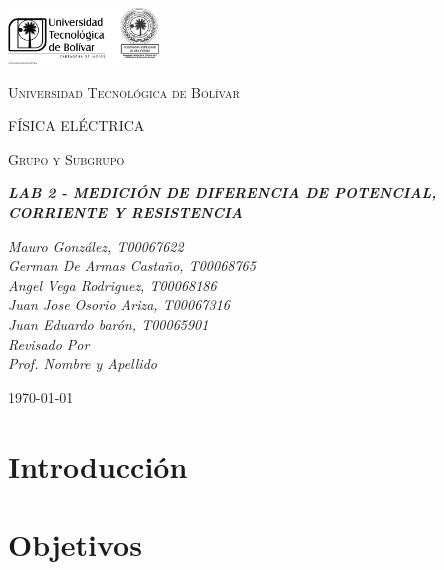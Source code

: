 \documentclass[letterpaper, 12pt]{report}
\begin{document}
\begin{titlepage}
	\centering
	\includegraphics[width=0.3\textwidth]{Images/logo_utb.png}\par\vspace{1cm}
	{\scshape\LARGE Universidad Tecnológica de Bolívar \par}
	\vspace{1cm}

	{\scshape\Large FÍSICA ELÉCTRICA \par}
	\vspace{.2cm}

	{\scshape\Large Grupo y Subgrupo \par}
	\vspace{1cm}

	\slshape {\Large \bfseries{} LAB 2 - MEDICIÓN DE DIFERENCIA DE POTENCIAL, CORRIENTE Y RESISTENCIA \\}
	\vspace{1cm}

	\slshape {\itshape{} Mauro González, T00067622 \\}
	\slshape {\itshape{} German De Armas Castaño, T00068765 \\}
	\slshape {\itshape{} Angel Vega Rodriguez, T00068186 \\}
	\slshape {\itshape{} Juan Jose Osorio Ariza, T00067316 \\}
	\slshape {\itshape{} Juan Eduardo barón, T00065901 \\}
	\vfill
	Revisado Por \\
	Prof. Nombre y Apellido 	\\
	{\large \today\par}
\end{titlepage}

\section{Introducción}

\newpage

\section{Objetivos}
\end{document}

